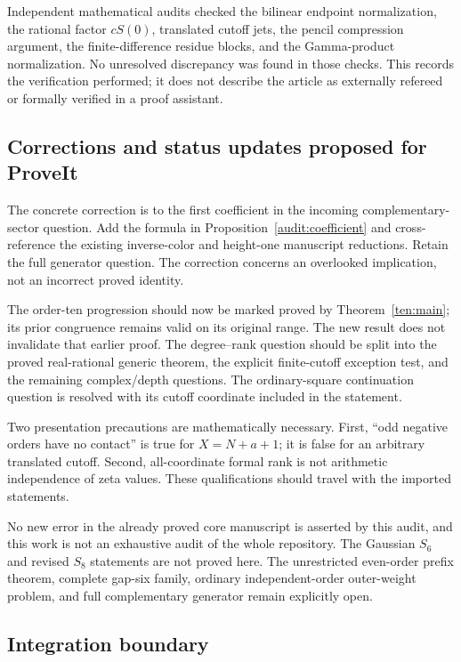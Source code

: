 \documentclass[11pt]{article}
\theoremstyle{definition}
\theoremstyle{remark}
\numberwithin{equation}{section}
\begin{document}
Independent mathematical audits checked the bilinear endpoint
normalization, the rational factor $cS(0)$, translated cutoff jets,
the pencil compression argument, the finite-difference residue
blocks, and the Gamma-product normalization. No unresolved
discrepancy was found in those checks. This records the verification
performed; it does not describe the article as externally refereed
or formally verified in a proof assistant.

\subsection{Corrections and status updates proposed for ProveIt}

The concrete correction is to the first coefficient in the incoming
complementary-sector question. Add the formula in
Proposition~\ref{audit:coefficient} and cross-reference the existing
inverse-color and height-one manuscript reductions. Retain the full
generator question. The correction concerns an overlooked implication,
not an incorrect proved identity.

The order-ten progression should now be marked proved by
Theorem~\ref{ten:main}; its prior congruence remains valid on its
original range. The new result does not invalidate that earlier proof.
The degree--rank question should be split into the proved real-rational
generic theorem, the explicit finite-cutoff exception test, and the
remaining complex/depth questions. The ordinary-square continuation
question is resolved with its cutoff coordinate included in the
statement.

Two presentation precautions are mathematically necessary. First,
``odd negative orders have no contact'' is true for $X=N+a+1$;
it is false for an arbitrary translated cutoff. Second, all-coordinate
formal rank is not arithmetic independence of zeta values. These
qualifications should travel with the imported statements.

No new error in the already proved core manuscript is asserted by
this audit, and this work is not an exhaustive audit of the whole
repository. The Gaussian $S_6$ and revised $S_8$ statements are not
proved here. The unrestricted even-order prefix theorem, complete
gap-six family, ordinary independent-order outer-weight problem,
and full complementary generator remain explicitly open.

\subsection{Integration boundary}
\end{document}

